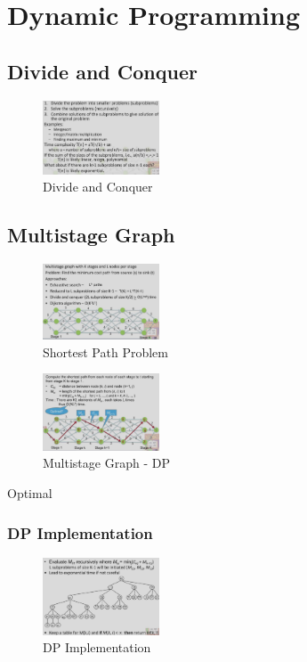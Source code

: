 \newpage
\section{Dynamic Programming}
\subsection{Divide and Conquer}
\begin{figure}[H]
    \centering
    \includegraphics[width=0.309\textwidth]{pic/DAA8/Divide and Conquer}
    \caption{Divide and Conquer}
\end{figure}

\subsection{Multistage Graph}
\begin{figure}[H]
    \centering
    \includegraphics[width=0.309\textwidth]{pic/DAA8/Multistage Graph}
    \caption{Shortest Path Problem}
\end{figure}

\begin{figure}[H]
    \centering
    \includegraphics[width=0.309\textwidth]{pic/DAA8/Multistage Graph - DP}
    \caption{Multistage Graph - DP}
\end{figure}
Optimal

\subsubsection{DP Implementation}
\begin{figure}[H]
    \centering
    \includegraphics[width=0.309\textwidth]{pic/DAA8/DP Implementation}
    \caption{DP Implementation}
\end{figure}

